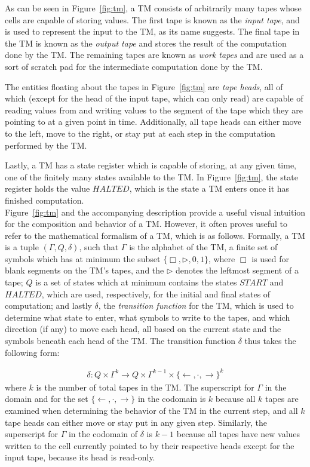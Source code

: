 \documentclass[usletter]{article}
\begin{document}
As can be seen in Figure~\ref{fig:tm}, a TM consists of arbitrarily many tapes whose cells are capable of storing values. The first tape is known as the \emph{input tape}, and is used to represent the input to the TM, as its name suggests. The final tape in the TM is known as the \emph{output tape} and stores the result of the computation done by the TM. The remaining tapes are known as \emph{work tapes} and are used as a sort of scratch pad for the intermediate computation done by the TM.

The entities floating about the tapes in Figure~\ref{fig:tm} are \emph{tape heads}, all of which (except for the head of the input tape, which can only read) are capable of reading values from and writing values to the segment of the tape which they are pointing to at a given point in time. Additionally, all tape heads can either move to the left, move to the right, or stay put at each step in the computation performed by the TM.

Lastly, a TM has a state register which is capable of storing, at any given time, one of the finitely many states available to the TM. In Figure~\ref{fig:tm}, the state register holds the value $HALTED$, which is the state a TM enters once it has finished computation.\\

Figure~\ref{fig:tm} and the accompanying description provide a useful visual intuition for the composition and behavior of a TM. However, it often proves useful to refer to the mathematical formalism of a TM, which is as follows. Formally, a TM is a tuple $(\Gamma, Q, \delta)$, such that $\Gamma$ is the alphabet of the TM, a finite set of symbols which has at minimum the subset $\{\Box, \rhd, 0, 1\}$, where $\Box$ is used for blank segments on the TM's tapes, and the $\rhd$ denotes the leftmost segment of a tape; $Q$ is a set of states which at minimum contains the states $START$ and $HALTED$, which are used, respectively, for the initial and final states of computation; and lastly $\delta$, the \emph{transition function} for the TM, which is used to determine what state to enter, what symbols to write to the tapes, and which direction (if any) to move each head, all based on the current state and the symbols beneath each head of the TM. The transition function $\delta$ thus takes the following form: 

\begin{align}
\delta : Q \times \Gamma^k \rightarrow Q \times \Gamma^{k-1}\times \{\leftarrow, \cdot, \rightarrow\}^k
\end{align}
where $k$ is the number of total tapes in the TM. The superscript for $\Gamma$ in the domain and for the set $\{\leftarrow, \cdot, \rightarrow\}$ in the codomain is $k$ because all $k$ tapes are examined when determining the behavior of the TM in the current step, and all $k$ tape heads can either move or stay put in any given step. Similarly, the superscript for $\Gamma$ in the codomain of $\delta$ is $k-1$ because all tapes have new values written to the cell currently pointed to by their respective heads except for the input tape, because its head is read-only.
\end{document}
